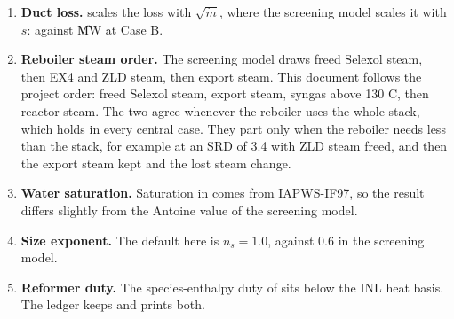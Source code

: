 \begin{enumerate}[leftmargin=*,itemsep=2pt]
\item \textbf{Duct loss.}  scales the loss with $\sqrt{\dot m}$, where the screening model scales it with $s$: \cDuctRoot{} against \vQductB{} \U{MW} at Case B.
\item \textbf{Reboiler steam order.} The screening model draws freed Selexol steam, then EX4 and ZLD steam, then export steam. This document follows the project order: freed Selexol steam, export steam, syngas above 130 C, then reactor steam. The two agree whenever the reboiler uses the whole stack, which holds in every central case. They part only when the reboiler needs less than the stack, for example at an SRD of 3.4 with ZLD steam freed, and then the export steam kept and the lost steam change.
\item \textbf{Water saturation.} Saturation in  comes from IAPWS-IF97, so the result differs slightly from the Antoine value of the screening model.
\item \textbf{Size exponent.} The default here is $n_s=1.0$, against 0.6 in the screening model.
\item \textbf{Reformer duty.} The species-enthalpy duty of  sits below the INL heat basis. The ledger keeps  and prints both.
\end{enumerate}
